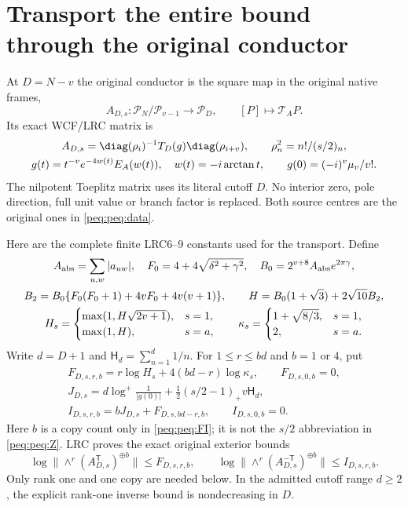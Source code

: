 \section{Transport the entire bound through the original conductor}
At $D=N-v$ the original conductor is the square map in the original native frames,
\[
 A_{D,s}:\mathcal P_N/\mathcal P_{v-1}\longrightarrow\mathcal P_D,
 \qquad[P]\longmapsto\mathcal T_AP.
\]
Its exact WCF/LRC matrix is
\begin{equation}
\begin{gathered}
 A_{D,s}=\diag(\rho_i)^{-1}T_D(g)\diag(\rho_{i+v}),\qquad
 \rho_n^2=n!/(s/2)_n,\\
 g(t)=t^{-v}e^{-4w(t)}E_A(w(t)),\quad w(t)=-i\arctan t,\qquad
 g(0)=(-i)^v\mu_v/v!.
\end{gathered}\label{peq:peq:conductor}
\end{equation}
The nilpotent Toeplitz matrix uses its literal cutoff $D$. No interior zero, pole direction, full unit value or branch factor is replaced. Both source centres are the original ones in \eqref{peq:peq:data}.

Here are the complete finite LRC6--9 constants used for the transport. Define
\begin{equation}
\begin{gathered}
 A_{\rm abs}=\sum_{u,w}|a_{uw}|,\quad
 F_0=4+4\sqrt{\delta^2+\gamma^2},\quad
 B_0=2^{v+8}A_{\rm abs}e^{2\pi\gamma},\\
 B_2=B_0\{F_0(F_0+1)+4vF_0+4v(v+1)\},\qquad
 H=B_0(1+\sqrt3)+2\sqrt{10}B_2,\\
 H_s=\begin{cases}\max(1,H\sqrt{2v+1}),&s=1,\\
                 \max(1,H),&s=a,\end{cases}
 \qquad
 \kappa_s=\begin{cases}1+\sqrt{8/3},&s=1,\\2,&s=a.\end{cases}
\end{gathered}\label{peq:peq:H}
\end{equation}
Write $d=D+1$ and $\mathsf H_d=\sum_{n=1}^d1/n$. For $1\le r\le bd$ and $b=1$ or $4$, put
\begin{equation}
\begin{gathered}
 F_{D,s,r,b}=r\log H_s+4(bd-r)\log\kappa_s,\qquad F_{D,s,0,b}=0,\\
 J_{D,s}=d\log^+\frac1{|g(0)|}
       +\tfrac12(s/2-1)_+v\mathsf H_d,\\
 I_{D,s,r,b}=bJ_{D,s}+F_{D,s,bd-r,b},\qquad I_{D,s,0,b}=0.
\end{gathered}\label{peq:peq:FI}
\end{equation}
Here $b$ is a copy count only in \eqref{peq:peq:FI}; it is not the $s/2$ abbreviation in \eqref{peq:peq:Z}. LRC proves the exact original exterior bounds
\[
 \log\|\wedge^r(A_{D,s}^{\mathsf T})^{\oplus b}\|\le F_{D,s,r,b},
 \qquad
 \log\|\wedge^r(A_{D,s}^{-\mathsf T})^{\oplus b}\|\le I_{D,s,r,b}.
\]
Only rank one and one copy are needed below. In the admitted cutoff range $d\ge2$, the explicit rank-one inverse bound is nondecreasing in $D$.


